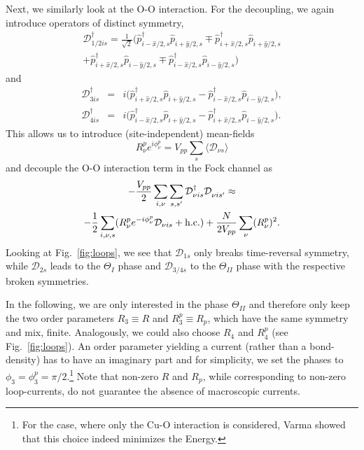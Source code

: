 \documentclass[prb, twocolumn,showpacs,preprintnumbers,amsmath,amssymb, floatfix]{revtex4}
\begin{document}
Next, we similarly look at the O-O interaction. For the decoupling, we again introduce operators of distinct symmetry,
\begin{multline}
  \mathcal{D}^\dag_{1/2 i s} = \frac{1}{\sqrt2}\Big(\hat{p}^\dag_{i-\hat{x}/2, s} \hat{p}^{\phantom{\dag}}_{i+\hat{y}/2, s} \mp \hat{p}^\dag_{i+\hat{x}/2, s} \hat{p}^{\phantom{\dag}}_{i+\hat{y}/2, s}\\
  + \hat{p}^\dag_{i+\hat{x}/2, s} \hat{p}^{\phantom{\dag}}_{i-\hat{y}/2, s} \mp \hat{p}^\dag_{i-\hat{x}/2, s} \hat{p}^{\phantom{\dag}}_{i-\hat{y}/2, s}\Big)
  \label{eq:d12}
\end{multline}
and 
\begin{eqnarray}
  \mathcal{D}^\dag_{3 i s} &=& i\Big(\hat{p}^\dag_{i+\hat{x}/2, s} \hat{p}^{\phantom{\dag}}_{i+\hat{y}/2, s} - \hat{p}^\dag_{i-\hat{x}/2, s} \hat{p}^{\phantom{\dag}}_{i-\hat{y}/2, s}\Big)\label{eq:d3},\\
  \mathcal{D}^\dag_{4 i s} &=& i\Big(\hat{p}^\dag_{i-\hat{x}/2, s} \hat{p}^{\phantom{\dag}}_{i+\hat{y}/2 ,s} - \hat{p}^\dag_{i+\hat{x}/2, s} \hat{p}^{\phantom{\dag}}_{i-\hat{y}/2, s}\Big).
  \label{eq:d4}
\end{eqnarray}
This allows us to introduce (site-independent) mean-fields
\begin{equation}
  R^{p}_{\nu}e^{i\phi^p_{\nu}} = V_{pp}\sum_s \langle \mathcal{D}_{\nu s}\rangle
  \label{eq:oomf}
\end{equation}
and decouple the O-O interaction term in the Fock channel as
\begin{multline}
  -\frac{V_{pp}}2 \sum_{i, \nu} \sum_{s, s'} \mathcal{D}^{\dag}_{\nu i s} \mathcal{D}^{\phantom{\dag}}_{\nu i s'}\approx \\
  -\frac{1}2 \sum_{i,\nu, s}(R^p_{\nu} e^{-i\phi^p_{\nu}}\mathcal{D}_{\nu i s}+ {\rm h.c.}) + \frac{N}{2V_{pp}}\sum_{\nu}(R^p_{\nu})^2.  
  \label{eq:dddecoupling}
\end{multline}
Looking at Fig.~\ref{fig:loops}, we see that $\mathcal{D}_{1s}$ only breaks time-reversal symmetry, while $\mathcal{D}_{2s}$ leads to the $\Theta_I$ phase and $\mathcal{D}_{3/4 s}$ to the $\Theta_{II}$ phase with the respective broken symmetries. 

In the following, we are only interested in the phase $\Theta_{II}$
and therefore only keep the two order parameters $R_{3}\equiv R$ and
$R^p_{3}\equiv R_p$, which have the same symmetry and mix,
finite. Analogously, we could also choose $R_{4}$ and $R^p_{4}$ (see
Fig.~\ref{fig:loops}). An order parameter yielding a current
(rather than a bond-density) has to have an imaginary part and for
simplicity, we set the phases to $\phi_3=\phi^p_3 =
\pi/2$.\footnote{For the case, where only the Cu-O interaction is
  considered, Varma showed that this choice indeed minimizes the
  Energy.\cite{varma:2006b}} Note that non-zero $R$ and $R_p$, while
corresponding to non-zero loop-currents, do not guarantee the absence
of macroscopic currents.
\end{document}
